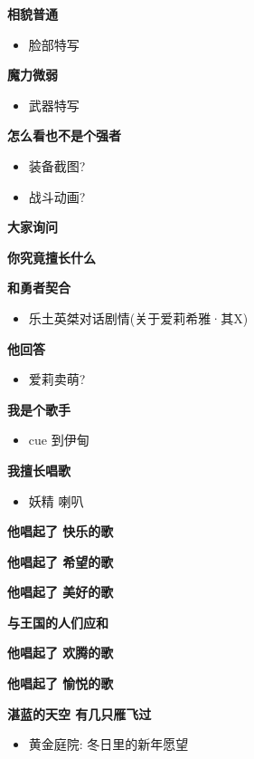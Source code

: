 \documentclass[a4paper]{article}
\begin{document}
\textbf{相貌普通}

\begin{itemize}
    \item 脸部特写
\end{itemize}

\textbf{魔力微弱}

\begin{itemize}
    \item 武器特写
\end{itemize}

\textbf{怎么看也不是个强者}

\begin{itemize}
    \item 装备截图?
    \item 战斗动画?
\end{itemize}

\textbf{大家询问}

\textbf{你究竟擅长什么}

\textbf{和勇者契合}

\begin{itemize}
    \item 乐土英桀对话剧情(关于爱莉希雅·其X)
\end{itemize}

\textbf{他回答}

\begin{itemize}
    \item 爱莉卖萌?
\end{itemize}

\textbf{我是个歌手}

\begin{itemize}
    \item cue 到伊甸
\end{itemize}

\textbf{我擅长唱歌}

\begin{itemize}
    \item 妖精 喇叭
\end{itemize}

\textbf{他唱起了 快乐的歌}

\textbf{他唱起了 希望的歌}

\textbf{他唱起了 美好的歌}

\textbf{与王国的人们应和}

\textbf{他唱起了 欢腾的歌}

\textbf{他唱起了 愉悦的歌}

\textbf{湛蓝的天空 有几只雁飞过}

\begin{itemize}
    \item 黄金庭院: 冬日里的新年愿望
\end{itemize}
\end{document}
